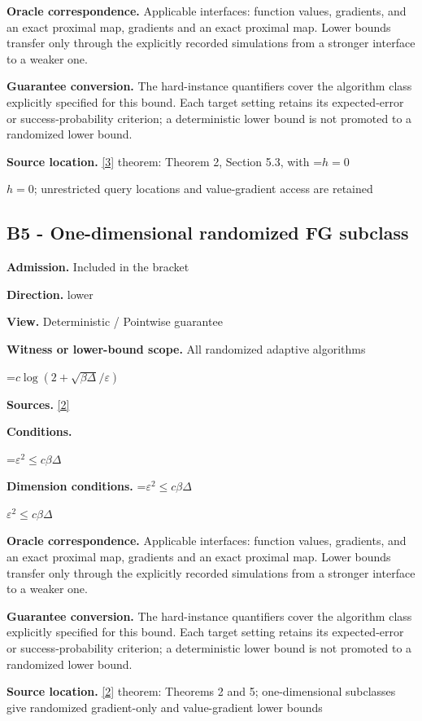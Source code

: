 \documentclass[10pt,a4paper]{article}
\newcommand{\AtlasMath}[1]{\par\begingroup\centering\setbox0=\hbox{$\displaystyle #1$}\ifdim\wd0>1.4\linewidth\typeout{ATLAS WIDE FORMULA: \the\wd0}\fi\ifdim\wd0>\linewidth\resizebox{\linewidth}{!}{\box0}\else\box0\fi\par\endgroup}
\newcommand{\AtlasInlineMath}[1]{\begingroup\setbox0=\hbox{$#1$}\ifdim\wd0>.4\linewidth\endgroup\AtlasMath{#1}\else\endgroup$#1$\fi}
\begin{document}
\textbf{Oracle correspondence.} Applicable interfaces: function values, gradients, and an exact proximal map, gradients and an exact proximal map. Lower bounds transfer only through the explicitly recorded simulations from a stronger interface to a weaker one.

\textbf{Guarantee conversion.} The hard-instance quantifiers cover the algorithm class explicitly specified for this bound. Each target setting retains its expected-error or success-probability criterion; a deterministic lower bound is not promoted to a randomized lower bound.

\textbf{Source location.} \href{https://arxiv.org/pdf/1710.11606}{[3]} theorem: Theorem 2, Section 5.3, with \AtlasInlineMath{h=0}; unrestricted query locations and value-gradient access are retained

\subsection{B5 - One-dimensional randomized FG subclass}
\textbf{Admission.} Included in the bracket

\textbf{Direction.} lower

\textbf{View.} Deterministic / Pointwise guarantee

\textbf{Witness or lower-bound scope.} All randomized adaptive algorithms

\AtlasMath{c\log(2+\sqrt{\beta\Delta}/\varepsilon)}
\textbf{Sources.} \href{https://arxiv.org/pdf/2209.07513}{[2]}

\textbf{Conditions.} 
\AtlasMath{\varepsilon^2\le c\beta\Delta}


\textbf{Dimension conditions.} \AtlasInlineMath{\varepsilon^2\le c\beta\Delta}

\textbf{Oracle correspondence.} Applicable interfaces: function values, gradients, and an exact proximal map, gradients and an exact proximal map. Lower bounds transfer only through the explicitly recorded simulations from a stronger interface to a weaker one.

\textbf{Guarantee conversion.} The hard-instance quantifiers cover the algorithm class explicitly specified for this bound. Each target setting retains its expected-error or success-probability criterion; a deterministic lower bound is not promoted to a randomized lower bound.

\textbf{Source location.} \href{https://arxiv.org/pdf/2209.07513}{[2]} theorem: Theorems 2 and 5; one-dimensional subclasses give randomized gradient-only and value-gradient lower bounds
\end{document}
